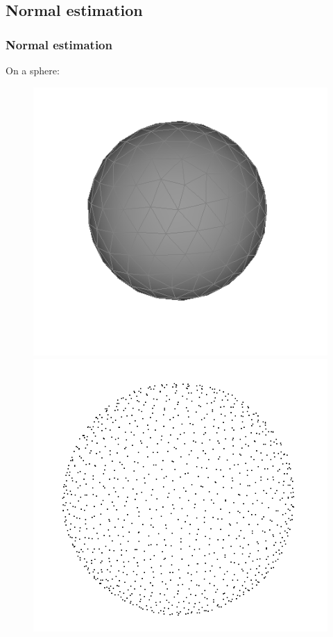 \documentclass{beamer}
\begin{document}
\subsection{Normal estimation}
\begin{frame}
    \frametitle{Normal estimation}

    On a sphere:
    \begin{figure}
        \centering
        \includegraphics[scale=0.2]{img/sphere-polyhedron-200}
        \includegraphics[scale=0.15]{img/sphere-1000}

\end{figure}
\end{frame}
\end{document}
